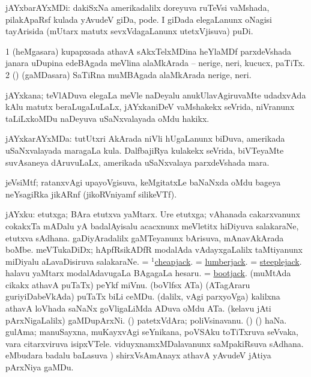 \bentry
{}
\gl{\nA}
\bmng
jAYxbarAYxMDi: 
\banum
{} dakiSxNa amerikadalilx doreyuva ruTeVsi vaMshada, pilakApaRsf kulada yAvudeV giDa, pode. 
 I giDada elegaLanunx oNagisi tayArisida (mUtarx matutx sevxVdagaLanunx utetxVjisuva) puDi. 
\eanum
\emng
\eentry

\bentry
{}
\gl{\nA}
\bmng
\bnum
\num{1} (heMgasara) kupapxsada athavA sAkxTelxMDina heYlaMDf parxdeVshada janara uDupina edeBAgada meVlina alaMkArada -- nerige, neri, kucucx, paTiTx. 
\num{2} (\ca) (gaMDasara) SaTiRna muMBAgada alaMkArada nerige, neri. 
\enum
\emng
\eentry

\bentry
{}
\gl{\nA}
\bmng
jAYxkana; teVlADuva elegaLa meVle naDeyalu anukUlavAgiruvaMte udadxvAda kAlu matutx beraLugaLuLaLx, jAYxkaniDeV vaMshakekx seVrida, niVranunx taLiLxkoMDu naDeyuva uSaNxvalayada oMdu hakikx. 
\emng
\eentry

\bentry
{}
\gl{\nA}
\bmng
jAYxkarAYxMDa: 
\banum
{} tutUtxri AkArada niVli hUgaLanunx biDuva, amerikada uSaNxvalayada maragaLa kula. 
 DalfbajiRya kulakekx seVrida, biVTeyaMte suvAsaneya dAruvuLaLx, amerikada uSaNxvalaya parxdeVshada mara. 
\eanum
\emng
\eentry

\bentry
{}
\gl{\nA}
\bmng
jeVsiMtf; ratanxvAgi upayoVgisuva, keMgitatxLe baNaNxda oMdu bageya neYsagiRka jikARnf (jikoRVniyamf silikeVTf). 
\emng
\eentry

\bentry
{}
\gl{\nA}
\bmng
jAYxku: 
\banum
{} etutxga; BAra etutxva yaMtarx. 
 Ure etutxga; vAhanada cakarxvanunx cokakxTa mADalu yA badalAyisalu acacxnunx meVletitx hiDiyuva salakaraNe, etutxva sAdhana.   
 gaDiyAradalilx gaMTeyanunx bArisuva, mAnavAkArada boMbe. 
 meVTukaDiDx; hApfRsikADfR modalAda vAdayxgaLalilx taMtiyanunx miDiyalu aLavaDisiruva salakaraNe. 
  = \hyperref{kandict_c.pdf}{C}{cheapjack(1)}{$^1$cheapjack}. 
  = \hyperref{kandict_l.pdf}{L}{lumberjack}{lumberjack}. 
  = \hyperref{kandict_s.pdf}{S}{steeplejack}{steeplejack}. 
 halavu yaMtarx modalAdavugaLa BAgagaLa hesaru. 
  = \hyperref{kandict_b.pdf}{B}{bootjack}{bootjack}. 
 (muMtAda cikakx athavA puTaTx) peYkf miVnu. 
 (boVlfsx ATa) (ATagAraru guriyiDabeVkAda) puTaTx biLi ceMDu. 
 (\bava dalilx, \Eva vAgi parxyoVga) kalilxna athavA loVhada saNaNx goVligaLiMda ADuva oMdu ATa. 
 (kelavu jAti pArxNigaLalilx) gaMDupArxNi. 
 (\ashi) patetxVdAra; poliVsinavanu. 
 (\ame) (\ashi) haNa. 
 gulAma; manuSayxna, muKayxvAgi seYnikana, poVSAku toTiTxruva seVvaka, \mo vara citarxviruva isipxVTele. 
 viduyxnamxMDalavanunx saMpakiRsuva sAdhana. 
  eMbudara badalu baLasuva \rUpa) shirxVsAmAnayx athavA yAvudeV jAtiya pArxNiya gaMDu. 
\eanum
\emng

